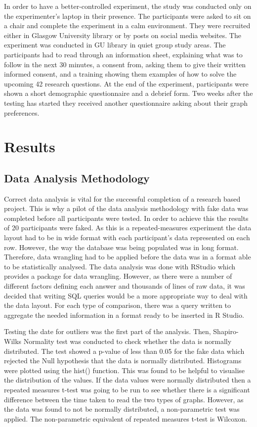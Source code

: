 \documentclass{l4proj}
\begin{document}
In order to have a better-controlled experiment, the study was conducted only on the experimenter's laptop in their presence. The participants were asked to sit on a chair and complete the experiment in a calm environment. They were recruited either in Glasgow University library or by posts on social media websites. The experiment was conducted in GU library in quiet group study areas. The participants had to read through an information sheet, explaining what was to follow in the next 30 minutes, a consent from, asking them to give their written informed consent, and a training showing them examples of how to solve the upcoming 42 research questions. At the end of the experiment, participants were shown a short demographic questionnaire and a debrief form. Two weeks after the testing has started they received another questionnaire asking about their graph preferences.


\section{Results}

\subsection{Data Analysis Methodology}

Correct data analysis is vital for the successful completion of a research based project. This is why a pilot of the data analysis methodology with fake data was completed before all participants were tested. In order to achieve this the results of 20 participants were faked. As this is a repeated-measures experiment the data layout had to be in wide format with each participant's data represented on each row. However, the way the database was being populated was in long format. Therefore, data wrangling had to be applied before the data was in a format able to be statistically analysed. The data analysis was done with RStudio which provides a package for data wrangling. However, as there were a number of different factors defining each answer and thousands of lines of raw data, it was decided that writing SQL queries would be a more appropriate way to deal with the data layout. For each type of comparison, there was a query written to aggregate the needed information in a format ready to be inserted in R Studio. 

Testing the date for outliers was the first part of the analysis. Then, Shapiro-Wilks Normality test was conducted to check whether the data is normally distributed. The test showed a p-value of less than 0.05 for the fake data which rejected the Null hypothesis that the data is normally distributed. Histograms were plotted using the hist() function. This was found to be helpful to visualise the distribution of the values. If the data values were normally distributed then a repeated measures t-test was going to be run to see whether there is a significant difference between the time taken to read the two types of graphs. However, as the data was found to not be normally distributed, a non-parametric test was applied. The non-parametric equivalent of repeated measures t-test is Wilcoxon. 
\end{document}
